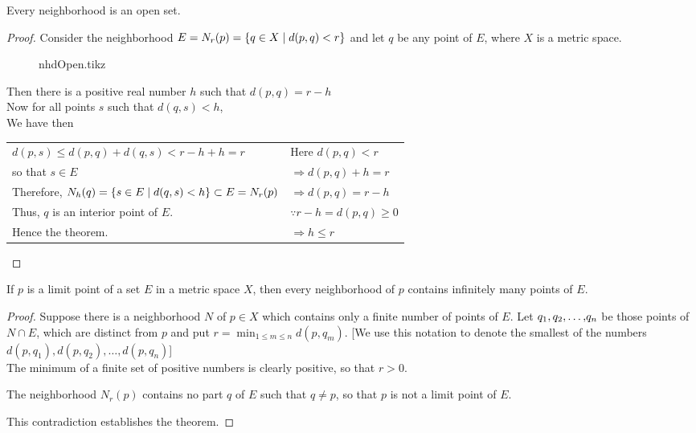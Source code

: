 \documentclass[../main-sheet.tex]{subfiles}
\begin{document}
\begin{thm}
    Every neighborhood is an open set.
\end{thm}
\begin{proof}
    Consider the neighborhood $ E=N_r(p)=\left\{q\in X\mid d(p,q)<r\right\} $ and let $ q $ be any point of $ E $, where $ X $ is a metric space.
    \begin{figure}[H]
        \centering
        {nhdOpen.tikz}
        \label{fig:thmNHDopen}
    \end{figure}
    Then there is a positive real number $ h $ such that $ d(p,q)=r-h $\\
    Now for all points $ s $ such that $ d(q,s)<h $,\\
    We have then\\
    \begin{tabular}{p{10cm} | l}
        $ d(p,s)\leq d(p,q)+d(q,s)<r-h+h=r $& Here $ d(p,q)<r $\\
        so that $ s\in E $ & $ \Rightarrow d(p,q)+h=r $\\
        Therefore, $ N_h(q)=\left\{s\in E\mid d(q,s)<h\right\}\subset E=N_r(p) $  & $ \Rightarrow d(p,q)=r-h $\\ 
        \cline{2-2} Thus, $ q $ is an interior point of $ E $.& $ \because r-h=d(p,q)\geq 0 $\\
        Hence the theorem. &$ \Rightarrow h\leq r $    
    \end{tabular}
    \space \qedhere
\end{proof}
\begin{thm}
    If $ p $ is a limit point of a set $ E $ in a metric space $ X $, then every neighborhood of $ p $ contains infinitely many points of $ E $.
\end{thm}
\begin{proof}
    Suppose there is a neighborhood $ N $ of $ p \in X $ which contains only a finite number of points of $ E $. Let  ${q}_1{,}\,{q}_2{,}\dots{,}{q}_n $ be those points of $ N\cap E $, which are distinct from $ p $ and put $ r= \operatorname*{min}_{1\leq m\leq n} d(p,q_m) $. [We use this notation to denote the smallest of the numbers $ d(p,q_1),d(p,q_2),\dots,d(p,q_n) $]\\
   The minimum of a finite set of positive numbers is clearly positive, so that $ r>0 $.

   The neighborhood $ N_r(p) $ contains no part $ q $ of $ E $ such that $ q\neq p $, so that $ p $ is not a limit point of $ E $.

   This contradiction establishes the theorem.
\end{proof}
\end{document}
